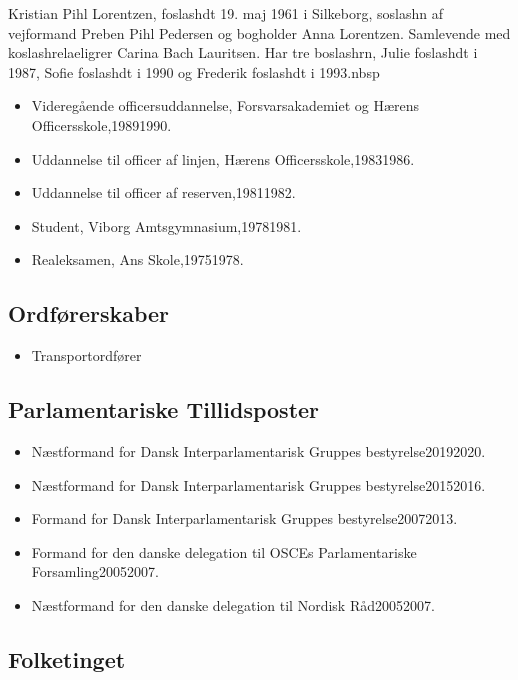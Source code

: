 \documentclass[11pt, a4paper]{awesome-cv}
\begin{document}
\makecvheader[R]
\makelettertitle
\begin{cvletter}
Kristian Pihl Lorentzen, foslashdt 19. maj 1961 i Silkeborg, soslashn af vejformand Preben Pihl Pedersen og bogholder Anna Lorentzen. Samlevende med koslashrelaeligrer Carina Bach Lauritsen. Har tre boslashrn, Julie foslashdt i 1987, Sofie foslashdt i 1990 og Frederik foslashdt i 1993.nbsp

\begin{itemize}
\item Videregående officersuddannelse, Forsvarsakademiet og Hærens Officersskole,19891990.
\item Uddannelse til officer af linjen, Hærens Officersskole,19831986.
\item Uddannelse til officer af reserven,19811982.
\item Student, Viborg Amtsgymnasium,19781981.
\item Realeksamen, Ans Skole,19751978.
\end{itemize}
\subsection*{Ordførerskaber}
\begin{itemize}
\item Transportordfører
\end{itemize}
\subsection*{Parlamentariske Tillidsposter}
\begin{itemize}
\item Næstformand for Dansk Interparlamentarisk Gruppes bestyrelse20192020.
\item Næstformand for Dansk Interparlamentarisk Gruppes bestyrelse20152016.
\item Formand for Dansk Interparlamentarisk Gruppes bestyrelse20072013.
\item Formand for den danske delegation til OSCEs Parlamentariske Forsamling20052007.
\item Næstformand for den danske delegation til Nordisk Råd20052007.
\end{itemize}
\subsection*{Folketinget}

\end{cvletter}
\end{document}
